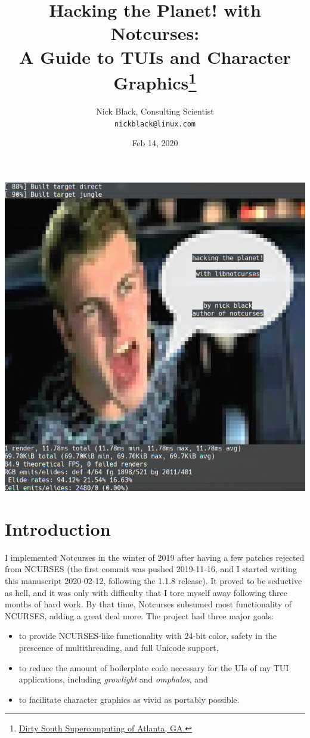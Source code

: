 \documentclass[letterpaper,10pt]{article}
\title{Hacking the Planet! with Notcurses:\\
A Guide to TUIs and Character Graphics\thanks{
 \href{https://www.dsscaw.com/}{Dirty South Supercomputing of Atlanta, GA.}
}\\
}
\author{Nick Black, Consulting Scientist\\
\texttt{nickblack@linux.com}
}
\newenvironment{denseitemize}{
  \begin{itemize}
      \setlength{\itemsep}{0pt}
}{
  \end{itemize}
}
\begin{document}
\date{Feb 14, 2020}
\maketitle
\thispagestyle{fancy}
\date{}
\vspace{1in}
\begin{center}
\includegraphics[width=.75\linewidth]{htp-with-notcurses.png}
\end{center}

\clearpage

\section{Introduction}

I implemented Notcurses in the winter of 2019 after having a few patches
rejected from NCURSES (the first commit was pushed 2019-11-16, and I started
writing this manuscript 2020-02-12, following the 1.1.8 release). It proved to
be seductive as hell, and it was only with difficulty that I tore myself away
following three months of hard work. By that time, Notcurses subsumed most
functionality of NCURSES, adding a great deal more. The project had three
major goals:

\begin{denseitemize}
\item  to provide NCURSES-like functionality with 24-bit color, safety in the
    prescence of multithreading, and full Unicode support,
\item to reduce the amount of boilerplate code necessary for the UIs of my
    TUI applications, including \textit{growlight} and \textit{omphalos}, and
\item to facilitate character graphics as vivid as portably possible.
\end{denseitemize}
\end{document}
